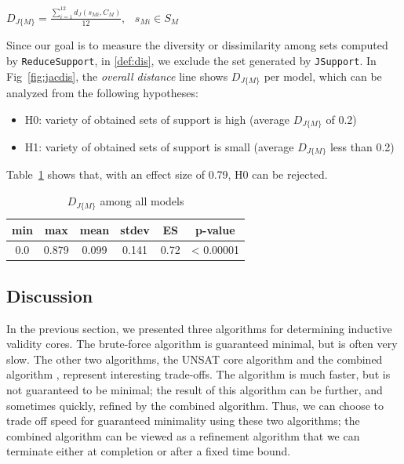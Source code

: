 \begin{definition}
  \label{def:dis}
  $D_{J\{M\}} =  \frac{\sum_{i=1}^{12}d_J(s_{Mi}, C_M)}{12},   \hspace{9pt} s_{Mi} \in S_M$
\end{definition}

Since our goal is to measure the diversity or dissimilarity among sets computed by \texttt{ReduceSupport}, in \ref{def:dis}, we exclude the set generated by \texttt{JSupport}. In Fig~\ref{fig:jacdis}, the \emph{overall distance} line shows $D_{J\{M\}}$ per model, which can be analyzed from the following hypotheses:
\begin{itemize}
  \item H0: variety of obtained sets of support is high (average $D_{J\{M\}}$ of 0.2)
  \item H1: variety of obtained sets of support is small (average $D_{J\{M\}}$ less than 0.2)
\end{itemize}
Table~\ref{tab:variety} shows that, with an effect size of 0.79, H0 can be rejected.
\begin{table}
  \centering
  \begin{tabular}{ |c|c|c|c|c|c| }
    \hline
     min & max & mean & stdev & ES & p-value\\[0.5ex]
    \hline
     0.0   & 0.879 & 0.099 & 0.141 & 0.72 & < 0.00001 \\[0.5ex]
    \hline
  \end{tabular}
  \caption{$D_{J\{M\}}$ among all models}
  \label{tab:variety}
\end{table}
\fi


\subsection{Discussion}

In the previous section, we presented three algorithms for determining
inductive validity cores. The brute-force algorithm is guaranteed
minimal, but is often very slow. The other two algorithms, the UNSAT
core algorithm \ucalg and the combined algorithm \ucbfalg, represent
interesting trade-offs. The \ucalg algorithm is much faster, but is
not guaranteed to be minimal; the result of this algorithm can be
further, and sometimes quickly, refined by the combined algorithm.
Thus, we can choose to trade off speed for guaranteed minimality using
these two algorithms; the combined algorithm can be viewed as a
refinement algorithm that we can terminate either at completion or
after a fixed time bound.


